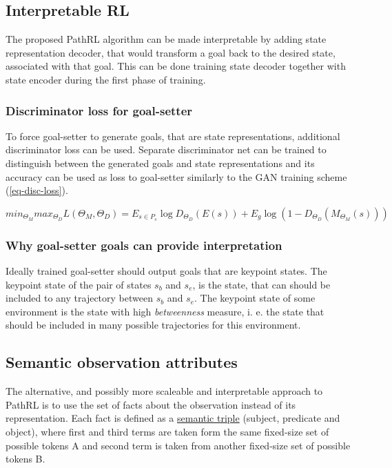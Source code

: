 \documentclass[acmsmall, nonacm]{acmart}
\begin{document}
\subsection{Interpretable RL}

The proposed PathRL algorithm can be made interpretable by adding state representation decoder, that would transform a goal back to the desired state, associated with that goal. This can be done training state decoder together with state encoder during the first phase of training.

\subsubsection{Discriminator loss for goal-setter}

To force goal-setter to generate goals, that are state representations, additional discriminator loss can be used. Separate discriminator net can be trained to distinguish between the generated goals and state representations and its accuracy can be used as loss to goal-setter similarly to the GAN training scheme (\ref{eq-disc-loss}).

\begin{equation} \label{eq-disc-loss}
min_{\Theta_M} max_{\Theta_D} L(\Theta_M, \Theta_D) = E_{s \in P_s} \log D_{\Theta_D}(E(s)) + E_g \log(1 - D_{\Theta_D}(M_{\Theta_M}(s)))
\end{equation}

\subsubsection{Why goal-setter goals can provide interpretation}

Ideally trained goal-setter should output goals that are keypoint states. The keypoint state of the pair of states $s_b$ and $s_e$, is the state, that can should be included to any trajectory between $s_b$ and $s_e$. The keypoint state of some environment is the state with high \emph{betweenness} measure, i. e. the state that should be included in many possible trajectories for this environment.

\subsection{Semantic observation attributes}

The alternative, and possibly more scaleable and interpretable approach to PathRL is to use the set of facts about the observation instead of its representation. Each fact is defined as a \href{https://en.wikipedia.org/wiki/Semantic_triple}{semantic triple} (subject, predicate and object), where first and third terms are taken form the same fixed-size set of possible tokens A and second term is taken from another fixed-size set of possible tokens B.
\end{document}
